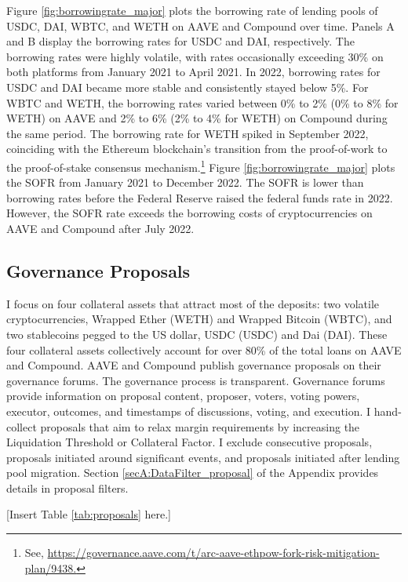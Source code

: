 \documentclass[12pt]{article}
\begin{document}
Figure \ref{fig:borrowingrate_major} plots the borrowing rate of lending pools of USDC, DAI, WBTC, and WETH on AAVE and Compound over time. Panels A and B display the borrowing rates for USDC and DAI, respectively. The borrowing rates were highly volatile, with rates occasionally exceeding 30\% on both platforms from January 2021 to April 2021. In 2022, borrowing rates for USDC and DAI became more stable and consistently stayed below 5\%. For WBTC and WETH, the borrowing rates varied between 0\% to 2\% (0\% to 8\% for WETH) on AAVE and 2\% to 6\% (2\% to 4\% for WETH) on Compound during the same period. The borrowing rate for WETH spiked in September 2022, coinciding with the Ethereum blockchain’s transition from the proof-of-work to the proof-of-stake consensus mechanism.\footnote{See, \href{https://governance.aave.com/t/arc-aave-ethpow-fork-risk-mitigation-plan/9438}{https://governance.aave.com/t/arc-aave-ethpow-fork-risk-mitigation-plan/9438.}} Figure \ref{fig:borrowingrate_major} plots the SOFR from January 2021 to December 2022. The SOFR is lower than borrowing rates before the Federal Reserve raised the federal funds rate in 2022. However, the SOFR rate exceeds the borrowing costs of cryptocurrencies on AAVE and Compound after July 2022.


\subsection{Governance Proposals}
 I focus on four collateral assets that attract most of the deposits: two volatile cryptocurrencies, Wrapped Ether (WETH) and Wrapped Bitcoin (WBTC), and two stablecoins pegged to the US dollar, USDC (USDC) and Dai (DAI). These four collateral assets collectively account for over 80\% of the total loans on AAVE and Compound. AAVE and Compound publish governance proposals on their governance forums. The governance process is transparent. Governance forums provide information on proposal content, proposer, voters, voting powers, executor, outcomes, and timestamps of discussions, voting, and execution. I hand-collect proposals that aim to relax margin requirements by increasing the Liquidation Threshold or Collateral Factor. I exclude consecutive proposals, proposals initiated around significant events, and proposals initiated after lending pool migration. Section \ref{secA:DataFilter_proposal} of the Appendix provides details in proposal filters. 

\centerline{[Insert Table \ref{tab:proposals} here.]}
\end{document}
